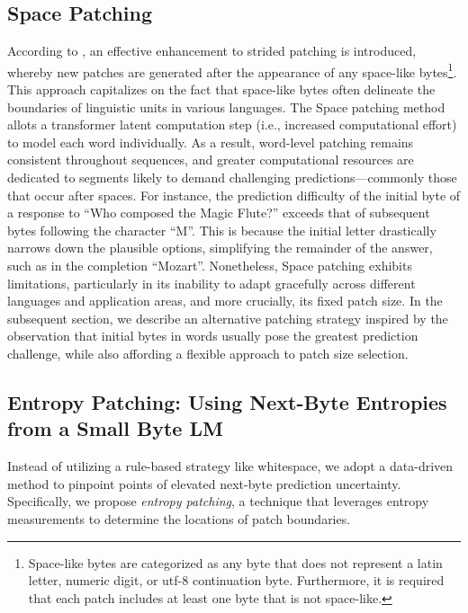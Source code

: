 \subsection{Space Patching}
\label{section:white-patch}

According to \citet{slagle2024spacebyte}, an effective enhancement to strided patching is introduced, whereby new patches are generated after the appearance of any space-like bytes\footnote{
    Space-like bytes are categorized as any byte that does not represent a latin letter, numeric digit, or utf-8 continuation byte. Furthermore, it is required that each patch includes at least one byte that is not space-like. }. This approach capitalizes on the fact that space-like bytes often delineate the boundaries of linguistic units in various languages. The Space patching method allots a transformer latent computation step (i.e., increased computational effort) to model each word individually. As a result, word-level patching remains consistent throughout sequences, and greater computational resources are dedicated to segments likely to demand challenging predictions—commonly those that occur after spaces. For instance, the prediction difficulty of the initial byte of a response to “Who composed the Magic Flute?\uline{\hspace{.6em}}” exceeds that of subsequent bytes following the character “M”. This is because the initial letter drastically narrows down the plausible options, simplifying the remainder of the answer, such as in the completion “Mozart”. Nonetheless, Space patching exhibits limitations, particularly in its inability to adapt gracefully across different languages and application areas, and more crucially, its fixed patch size. In the subsequent section, we describe an alternative patching strategy inspired by the observation that initial bytes in words usually pose the greatest prediction challenge, while also affording a flexible approach to patch size selection.

\subsection{Entropy Patching: Using Next-Byte Entropies from a Small Byte LM}
\label{section:dyn-patch}

Instead of utilizing a rule-based strategy like whitespace, we adopt a data-driven method to pinpoint points of elevated next-byte prediction uncertainty. Specifically, we propose \textit{entropy patching}, a technique that leverages entropy measurements to determine the locations of patch boundaries.

